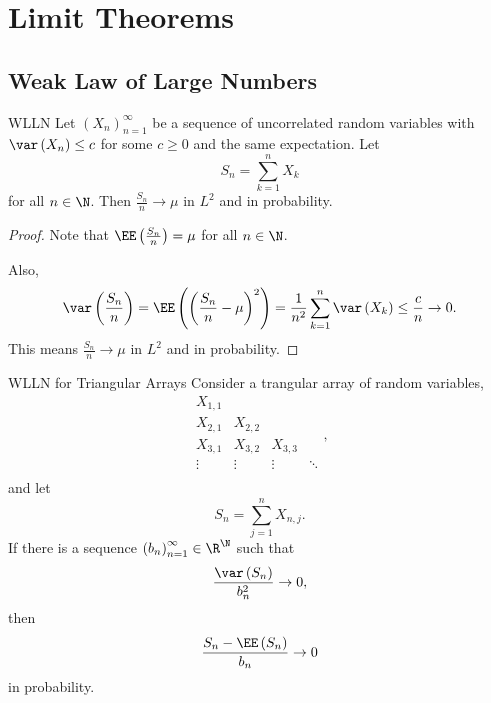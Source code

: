 \documentclass[stat901]{subfiles}
\begin{document}
    \section{Limit Theorems}
    
    \subsection{Weak Law of Large Numbers}
    
    \begin{theorem}{WLLN}
        Let $\left( X_{n} \right)^{\infty}_{n=1}$ be a sequence of uncorrelated random variables with $\var\left( X_n \right)\leq c$ for some $c\geq 0$ and the same expectation. Let
        \begin{equation*}
            S_n = \sum^{n}_{k=1} X_k
        \end{equation*}
        for all $n\in\N$. Then $\frac{S_n}{n}\to\mu$ in $L^2$ and in probability.
    \end{theorem}

    \begin{proof}
        Note that $\EE\left( \frac{S_n}{n} \right) = \mu$ for all $n\in\N$.

        Also,
        \begin{equation*}
            \var\left( \frac{S_n}{n} \right) =
            \EE\left( \left( \frac{S_n}{n}-\mu \right)^{2} \right) = \frac{1}{n^{2}} \sum^{n}_{k=1} \var\left( X_k \right) \leq \frac{c}{n} \to 0.
        \end{equation*}
        This means $\frac{S_n}{n}\to\mu$ in $L^2$ and in probability.
    \end{proof}
    
    \begin{theorem}{WLLN for Triangular Arrays}
        Consider a trangular array of random variables,
        \begin{equation*}
            \begin{matrix}
                X_{1,1} &  &  &  \\
                X_{2,1} & X_{2,2} &  &  \\
                X_{3,1} & X_{3,2} & X_{3,3} &  \\
            	\vdots & \vdots & \vdots & \ddots \\
            \end{matrix},
        \end{equation*}
        and let
        \begin{equation*}
            S_n = \sum^{n}_{j=1} X_{n,j}.
        \end{equation*}
        If there is a sequence $\left( b_{n} \right)^{\infty}_{n=1}\in\R^{\N}$ such that
        \begin{equation*}
            \frac{\var\left( S_n \right)}{b_n^{2}}\to 0,
        \end{equation*}
        then
        \begin{equation*}
            \frac{S_n-\EE\left( S_n \right)}{b_n} \to 0
        \end{equation*}
        in probability.
    \end{theorem}
    
\end{document}
